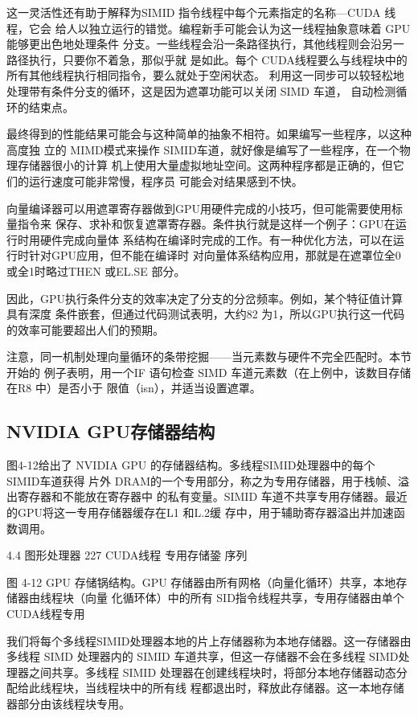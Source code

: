 这一灵活性还有助于解释为SIMID 指令线程中每个元素指定的名称—CUDA 线程，它会
给人以独立运行的错觉。编程新手可能会认为这一线程抽象意味着 GPU能够更出色地处理条件
分支。一些线程会沿一条路径执行，其他线程则会沿另一路径执行，只要你不着急，那似乎就
是如此。每个 CUDA线程要么与线程块中的所有其他线程执行相同指令，要么就处于空闲状态。
利用这一同步可以较轻松地处理带有条件分支的循环，这是因为遮罩功能可以关闭 SIMD 车道，
自动检测循环的结束点。

最终得到的性能结果可能会与这种简单的抽象不相符。如果编写一些程序，以这种高度独
立的 MIMD模式来操作 SIMID车道，就好像是编写了一些程序，在一个物理存储器很小的计算
机上使用大量虚拟地址空间。这两种程序都是正确的，但它们的运行速度可能非常慢，程序员
可能会对结果感到不快。

向量编译器可以用遮罩寄存器做到GPU用硬件完成的小技巧，但可能需要使用标量指令来
保存、求补和恢复遮罩寄存器。条件执行就是这样一个例子：GPU在运行时用硬件完成向量体
系结构在编译时完成的工作。有一种优化方法，可以在运行时针对GPU应用，但不能在编译时
对向量体系结构应用，那就是在遮罩位全0或全1时略过THEN 或EL.SE 部分。

因此，GPU执行条件分支的效率决定了分支的分岔频率。例如，某个特征值计算具有深度
条件嵌套，但通过代码测试表明，大约82%
为1，所以GPU执行这一代码的效率可能要超出人们的预期。

注意，同一机制处理向量循环的条带挖掘——当元素数与硬件不完全匹配时。本节开始的
例子表明，用一个IF 语句检查 SIMD 车道元素数（在上例中，该数目存储在R8 中）是否小于
限值（isn），并适当设置遮罩。

\subsection{NVIDIA GPU存储器结构}

图4-12给出了 NVIDIA GPU 的存储器结构。多线程SIMID处理器中的每个 SIMID车道获得
片外 DRAM的一个专用部分，称之为专用存储器，用于栈帧、溢出寄存器和不能放在寄存器中
的私有变量。SIMID 车道不共享专用存储器。最近的GPU将这一专用存储器缓存在L1 和L.2缓
存中，用于辅助寄存器溢出并加速函数调用。

4.4
图形处理器
227
CUDA线程
专用存储銎
序列

图 4-12 GPU 存储锅结构。GPU 存储器由所有网格（向量化循环）共享，本地存储器由线程块（向量
化循环体）中的所有 SID指令线程共享，专用存储器由单个 CUDA线程专用

我们将每个多线程SIMID处理器本地的片上存储器称为本地存储器。这一存储器由多线程
SIMD 处理器内的 SIMID 车道共享，但这一存储器不会在多线程 SIMD处理器之间共享。多线程
SIMID 处理器在创建线程块时，将部分本地存储器动态分配给此线程块，当线程块中的所有线
程都退出时，释放此存储器。这一本地存储器部分由该线程块专用。

